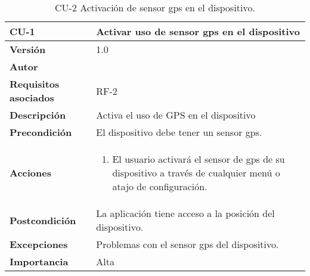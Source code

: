 \begin{table}[p]
	\centering
	\begin{tabularx}{\linewidth}{ p{} p{} }
		\toprule
		\textbf{CU-1}    & \textbf{Activar uso de sensor \acrshort{gps} en el dispositivo}\\
		\toprule
		\textbf{Versión}              & 1.0    \\
		\textbf{Autor}                & \autor \\
		\textbf{Requisitos asociados} & RF-2 \\
		\textbf{Descripción}          & Activa el uso de GPS en el dispositivo \\
		\textbf{Precondición}         & El dispositivo debe tener un sensor \acrshort{gps}. \\
		\textbf{Acciones}             &
		\begin{enumerate}
			\def\labelenumi{\arabic{enumi}.}
			\tightlist
			\item El usuario activará el sensor de \acrshort{gps} de su dispositivo a través de cualquier menú o atajo de configuración.
		\end{enumerate}\\
		\textbf{Postcondición}        & La aplicación tiene acceso a la posición del dispositivo. \\
		\textbf{Excepciones}          & Problemas con el sensor \acrshort{gps} del dispositivo. \\
		\textbf{Importancia}          & Alta \\
		\bottomrule
	\end{tabularx}
	\caption{CU-2 Activación de sensor \acrshort{gps} en el dispositivo.}
\end{table}


